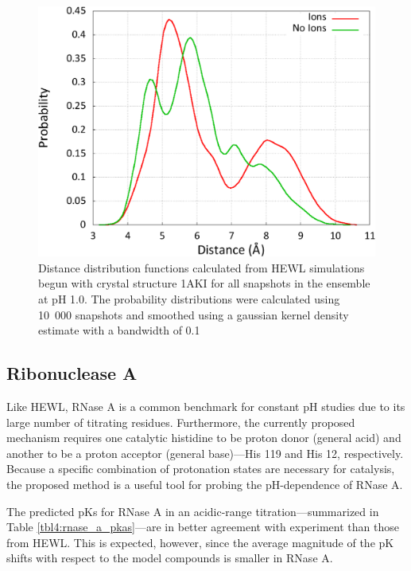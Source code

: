 \begin{figure}
   \includegraphics[width=6.5in]{HEWL_AspArg_Dist_Ion_Comparison.eps}
   \caption{Distance distribution functions calculated from HEWL simulations
            begun with crystal structure 1AKI for all snapshots in the ensemble
            at pH 1.0. The probability distributions were calculated using
            \mbox{10 000} snapshots and smoothed using a gaussian kernel density
            estimate with a bandwidth of 0.1}
   \label{fig4:hewl_asparg_dist}
\end{figure}

\subsection{Ribonuclease A}

Like HEWL, RNase A is a common benchmark for constant pH studies due to its
large number of titrating residues. Furthermore, the currently proposed
mechanism requires one catalytic histidine to be proton donor (general acid) and
another to be a proton acceptor (general base)---His 119 and His 12,
respectively. Because a specific combination of protonation states are necessary
for catalysis, the proposed method is a useful tool for probing the
pH-dependence of RNase A.

The predicted pKs for RNase A in an acidic-range titration---summarized
in Table \ref{tbl4:rnase_a_pkas}---are in better agreement with experiment than
those from HEWL. This is expected, however, since the average magnitude of the
pK shifts with respect to the model compounds is smaller in RNase A.

